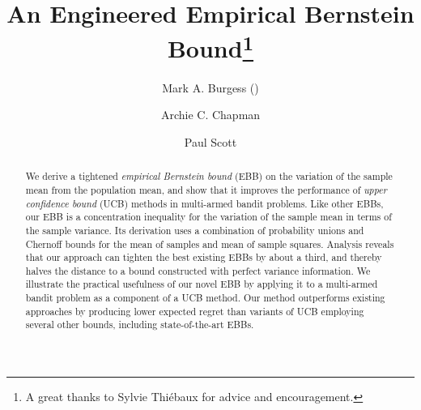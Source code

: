 \documentclass[runningheads, envcountsame, a4paper]{llncs}
\begin{document}
\title{An Engineered Empirical Bernstein Bound\thanks{A great thanks to Sylvie Thi\'ebaux for advice and encouragement.}
}

\author{Mark A. Burgess (\Letter) \and
Archie C. Chapman \and
Paul Scott}



\maketitle
\setcounter{footnote}{0}

\begin{abstract}
We derive a tightened \textit{empirical Bernstein bound} (EBB) on the variation of the sample mean from the population mean, and show that it improves the performance of \textit{upper confidence bound} (UCB) methods in multi-armed bandit problems.
Like other EBBs, our EBB is a concentration inequality for the variation of the sample mean in terms of the sample variance.
Its derivation uses a combination of probability unions and Chernoff bounds for the mean of samples and mean of sample squares.
Analysis reveals that our approach can tighten the best existing EBBs by about a third, 
and thereby halves the distance to a bound constructed with perfect variance information.
We illustrate the practical usefulness of our novel EBB by applying it to a multi-armed bandit problem as a component of a UCB method. 
Our method outperforms existing approaches by producing lower expected regret than variants of UCB employing several other bounds, including state-of-the-art EBBs.
\end{abstract}
\end{document}
